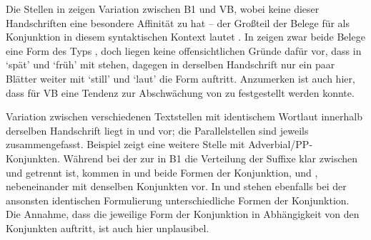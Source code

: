 Die Stellen in  zeigen Variation zwischen B1
und VB, wobei keine dieser Handschriften eine besondere Affinität zu
 hat -- der Großteil der Belege für  als
Konjunktion in diesem syntaktischen Kontext lautet . In
 zeigen zwar beide Belege eine Form des Typs
, doch liegen keine offensichtlichen Gründe dafür vor, dass in
  `spät' und  `früh'
mit  stehen, dagegen in der\-selben Handschrift nur ein paar Blätter
weiter mit  `still' und  `laut' die Form
 auftritt. Anzumerken ist auch hier, dass für VB eine
Tendenz zur Abschwächung von  zu  festgestellt werden
konnte.

Variation zwischen verschiedenen Textstellen mit identischem Wortlaut innerhalb
der\-selben Handschrift liegt in  und 
vor; die Parallelstellen sind jeweils zusammengefasst.
Beispiel  zeigt eine weitere Stelle mit
Adverbial/PP-Konjunkten. Während bei der
 zur  in B1 die
Verteilung der Suffixe klar zwischen 
und  getrennt ist, kommen in  und
 beide Formen der Konjunktion,  und
, nebeneinander mit denselben Konjunkten vor. In
 und  stehen ebenfalls bei der
ansonsten identischen Formulierung unterschiedliche Formen der Konjunktion. Die
Annahme, dass die jeweilige Form der Konjunktion in Abhängigkeit von den
Konjunkten auftritt, ist auch hier unplausibel.

